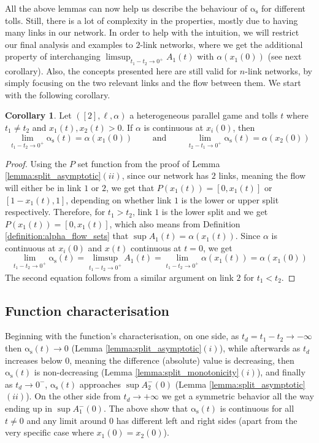 \documentclass[10pt,a4paper]{book}
\newcommand{\as}{\mathrm{\alpha_s}}
\theoremstyle{definition}
\newtheorem{corollary}[definition]{Corollary}
\theoremstyle{comment}
\begin{document}
All the above lemmas can now help us describe the behaviour of $\as$ for different tolls.
Still, there is a lot of complexity in the properties, mostly due to having many links in our network.
In order to help with the intuition, we will restrict our final analysis and examples to $2$-link networks, where we get the additional property of interchanging $\limsup_{t_1 - t_2 \rightarrow 0^+} A_1(t)$ with $\alpha(x_1(0))$ (see next corollary).
Also, the concepts presented here are still valid for $n$-link networks, by simply focusing on the two relevant links and the flow between them.
We start with the following corollary.

\begin{corollary}
	\label{corollary:split_asymptotic_continuous}
	Let $([2], \ell, \alpha)$ a heterogeneous parallel game and tolls $t$ where $t_1 \ne t_2$ and $x_1(t), x_2(t) > 0$.
	If $\alpha$ is continuous at $x_i(0)$, then
	\[
		\lim_{t_1 - t_2 \rightarrow 0^+} \as(t) = \alpha(x_1(0)) \qquad \text{ and } \qquad \lim_{t_2 - t_1 \rightarrow 0^+} \as(t) = \alpha(x_2(0))
	\]
\end{corollary}

\begin{proof}
	Using the $P$ set function from the proof of Lemma \ref{lemma:split_asymptotic}$(ii)$, since our network has $2$ links, meaning the flow will either be in link $1$ or $2$, we get that $P(x_1(t)) = [0, x_1(t)]$ or $[1 - x_1(t), 1]$, depending on whether link $1$ is the lower or upper split respectively.
	Therefore, for $t_1 > t_2$, link $1$ is the lower split and we get $P(x_1(t)) = [0, x_1(t)]$, which also means from Definition \ref{definition:alpha_flow_sets} that $\sup A_1(t) = \alpha(x_1(t))$.
	Since $\alpha$ is continuous at $x_i(0)$ and $x(t)$ continuous at $t = 0$, we get
	\[
		\lim_{t_1 - t_2 \rightarrow 0^+} \as(t) = \limsup_{t_1 - t_2 \rightarrow 0^+} A_1(t) = \lim_{t_1 - t_2 \rightarrow 0^+} \alpha(x_1(t)) = \alpha(x_1(0))
	\]
	The second equation follows from a similar argument on link $2$ for $t_1 < t_2$.
\end{proof}

\subsection{Function characterisation}

Beginning with the function's characterisation, on one side, as $t_d = t_1 - t_2 \rightarrow -\infty$ then $\as(t) \rightarrow 0$ (Lemma \ref{lemma:split_asymptotic}$(i)$), while afterwards as $t_d$ increases below $0$, meaning the difference (absolute) value is decreasing, then $\as(t)$ is non-decreasing (Lemma \ref{lemma:split_monotonicity}$(i)$), and finally as $t_d \rightarrow 0^-$, $\as(t)$ approaches $\sup A_2^-(0)$ (Lemma \ref{lemma:split_asymptotic}$(ii)$).
On the other side from $t_d \rightarrow +\infty$ we get a symmetric behavior all the way ending up in $\sup A_1^-(0)$.
The above show that $\as(t)$ is continuous for all $t \ne 0$ and any limit around $0$ has different left and right sides (apart from the very specific case where $x_1(0) = x_2(0)$).
\end{document}
